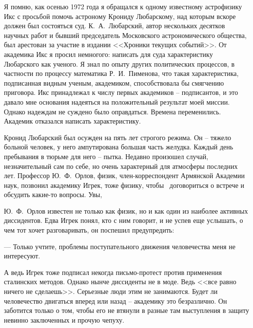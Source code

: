 \documentclass{book}
\begin{document}
Я помню, как осенью 1972 года я обращался к одному известному астрофизику Икс с просьбой помочь астроному Крониду Любарскому, над которым вскоре должен был сос\-то\-ять\-­ся суд. К.~А.~Любарский, автор нескольких десятков научных работ и бывший председатель Московского астрономическо­го общества, был арестован за участие в издании <<Хроники те­кущих событий>>. От академика Икс я просил немногого: напи­сать для суда характеристику Любарского как ученого. Я знал по опыту других политических процессов, в частности по про­цессу математика Р.~И.~Пименова, что такая характеристика, подписанная видным ученым, академиком, способствовала бы смягчению приговора. Икс принадлежал к числу первых академиков -- подписантов, и это давало мне основания наде­яться на положительный результат моей миссии. Однако на­деждам не суждено было оправдаться. Времена переменились. Академик отказался написать характеристику.

Кронид Любарский был осужден на пять лет строгого ре­жима. Он -- тяжело больной человек, у него ампутирована большая часть желудка. Каждый день пребывания в тюрьме для него -- пытка.
Недавно произошел случай, незначительный сам по себе, но очень характерный для атмосферы последних лет. Профес­сор Ю.~Ф.~Орлов, физик, член-корреспондент Армянской Академии наук, позвонил академику Игрек, тоже физику, чтобы  договориться о встрече и обсудить какие-то вопросы. Увы,

Ю.~Ф.~Орлов известен не только как физик, но и как один из наиболее активных диссидентов. Едва Игрек понял, кто с ним говорит, и не успев еще услышать, о чем тот хочет разговаривать, он поспешил предупредить:

--- Только учтите, проблемы поступательного движения человечества меня не интересуют.

А ведь Игрек тоже подписал некогда письмо-протест против применения сталинских методов. Однако нынче диссиденты не в моде. Ведь <<все равно ничего не сделаешь>>. Серьезные люди этим не занимаются. Будет ли человечество двигаться вперед или назад -- академику это безразлично. Он заботится только о том, чтобы его не втянули в разные там выступления в защиту невинно заключенных и прочую чепуху.
\end{document}
